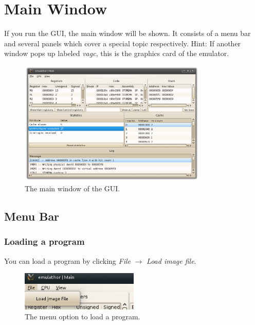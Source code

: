 \section{Main Window} 
If you run the GUI, the main window will be shown. It consists of a menu bar and several panels which cover a special topic respectively. Hint: If another window pops up labeled \emph{vagc}, this is the graphics card of the emulator.

\begin{figure}[H]
\begin{center}
	\includegraphics[width=0.8\textwidth]{./files/emu_gui_main.png}
\end{center}
	\caption{The main window of the GUI.}
\end{figure}

\subsection{Menu Bar}
\subsubsection{Loading a program}
You can load a program by clicking \emph{File} $\rightarrow$ \emph{Load image file}.

\begin{figure}[H]
\begin{center}
	\includegraphics[width=0.5\textwidth]{./files/emu_gui_menu_file.png}
\end{center}
	\caption{The menu option to load a program.}
\end{figure}

